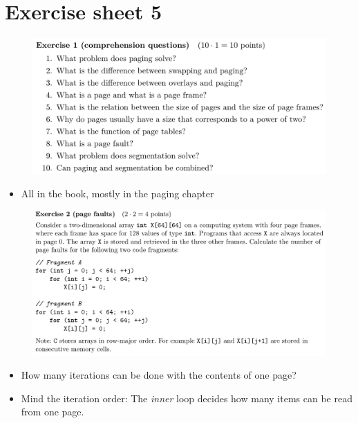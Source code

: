 \documentclass[10pt]{beamer}
\begin{document}
    
\section*{Exercise sheet 5}
\frame{\sectionpage}
\begin{frame}{}
 \begin{figure}
           \includegraphics[keepaspectratio, width=\textwidth, height=\textheight-2\baselineskip-2\baselineskip]{img/100_ex5.png} \\
        \end{figure}
        \begin{itemize}
         \item All in the book, mostly in the paging chapter
        \end{itemize}
        \framebreak
        
  \begin{figure}
          \includegraphics[keepaspectratio, width=\textwidth, height=\textheight-2\baselineskip-2\baselineskip]{img/101_ex5.png} \\
        \end{figure}
        \begin{itemize}
         \item How many iterations can be done with the contents of one page?
         \item Mind the iteration order: The \textit{inner} loop decides how many items can be read from one page.
        \end{itemize}
        \framebreak
        

\end{frame}
\end{document}
